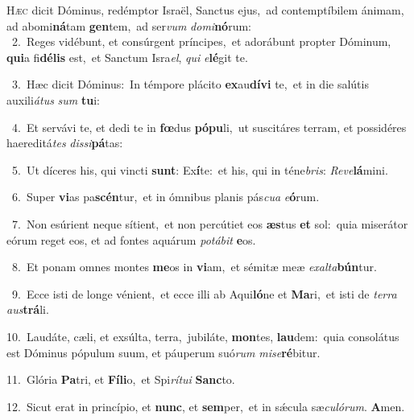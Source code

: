 \lettrine{\initial\textcolor{\initialcolor}{H}}{æc} dicit Dóminus, redémptor Israël, Sanctus ejus,~\dagger ad contemptíbilem ánimam, ad abomi\-\textbf{ná}\-tam \textbf{gen}\-tem,~\star ad ser\textit{vum} \textit{do}\-\textit{mi}\textbf{nó}rum:\\
{\numbfont\textcolor{\numbcolor}{~2.}}~Reges vidébunt, et consúrgent príncipes,~\dagger et adorábunt propter Dóminum, \textbf{qui}\-a fi\-\textbf{dé}\-\textbf{lis} est,~\star et Sanctum Isra\-\textit{el}\-, \textit{qui} \textit{e}\-\textbf{lé}git te.\par
{\numbfont\textcolor{\numbcolor}{~3.}}~Hæc dicit Dóminus:~\dagger In témpore plácito \textbf{ex}\-au\-\textbf{dí}\-\textbf{vi} te,~\star et in die salútis auxili\-\textit{á}\-\textit{tus} \textit{sum} \textbf{tu}\-i:\par
{\numbfont\textcolor{\numbcolor}{~4.}}~Et servávi te, et dedi te in \textbf{fœ}\-dus \textbf{pó}\-\textbf{pu}li,~\star ut suscitáres terram, et possidéres haereditá\textit{tes} \textit{dis}\-\textit{si}\textbf{pá}tas:\par
{\numbfont\textcolor{\numbcolor}{~5.}}~Ut díceres his, qui vincti \textbf{sunt}\-: Ex\-\textbf{í}\-te:~\star et his, qui in téne\-\textit{bris}\-: \textit{Re}\-\textit{ve}\textbf{lá}mini.\par
{\numbfont\textcolor{\numbcolor}{~6.}}~Super \textbf{vi}\-as pa\-\textbf{scén}\-tur,~\star et in ómnibus planis pás\-\textit{cu}\-\textit{a} \textit{e}\-\textbf{ó}rum.\par
{\numbfont\textcolor{\numbcolor}{~7.}}~Non esúrient neque sítient,~\dagger et non percútiet eos \textbf{æs}\-tus \textbf{et} sol:~\star quia miserátor eórum reget eos, et ad fontes aquárum \textit{po}\-\textit{tá}\textit{bit} \textbf{e}\-os.\par
{\numbfont\textcolor{\numbcolor}{~8.}}~Et ponam omnes montes \textbf{me}\-os in \textbf{vi}\-am,~\star et sémitæ meæ \textit{ex}\-\textit{al}\textit{ta}\textbf{bún}tur.\par
{\numbfont\textcolor{\numbcolor}{~9.}}~Ecce isti de longe vénient,~\dagger et ecce illi ab Aqui\-\textbf{ló}\-ne et \textbf{Ma}\-ri,~\star et isti de \textit{ter}\-\textit{ra} \textit{aus}\-\textbf{trá}li.\par
{\numbfont\textcolor{\numbcolor}{10.}}~Laudáte, cæli, et exsúlta, terra,~\dagger jubiláte, \textbf{mon}\-tes, \textbf{lau}\-dem:~\star quia consolátus est Dóminus pópulum suum, et páuperum suó\textit{rum} \textit{mi}\-\textit{se}\textbf{ré}bitur.\par
{\numbfont\textcolor{\numbcolor}{11.}}~Glória \textbf{Pa}\-tri, et \textbf{Fí}\-\textbf{li}o,~\star et Spi\-\textit{rí}\-\textit{tu}\textit{i} \textbf{Sanc}\-to.\par
{\numbfont\textcolor{\numbcolor}{12.}}~Sicut erat in princípio, et \textbf{nunc}\-, et \textbf{sem}\-per,~\star et in sǽcula sæ\-\textit{cu}\-\textit{ló}\textit{rum}. \textbf{A}\-men.\par
